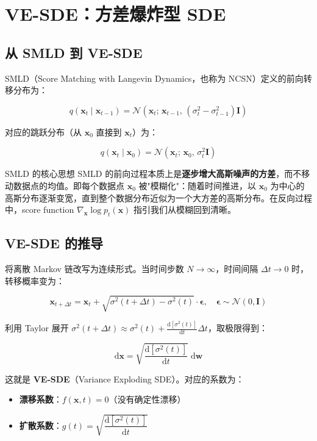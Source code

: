 \section{VE-SDE：方差爆炸型 SDE}

\subsection{从 SMLD 到 VE-SDE}

SMLD（Score Matching with Langevin Dynamics，也称为 NCSN）定义的前向转移分布为：

$$
q(\mathbf{x}_t \mid \mathbf{x}_{t-1}) = \mathcal{N}\!\left(\mathbf{x}_t;\, \mathbf{x}_{t-1},\, (\sigma_t^2 - \sigma_{t-1}^2)\mathbf{I}\right)
$$

对应的跳跃分布（从 $\mathbf{x}_0$ 直接到 $\mathbf{x}_t$）为：

$$
q(\mathbf{x}_t \mid \mathbf{x}_0) = \mathcal{N}\!\left(\mathbf{x}_t;\, \mathbf{x}_0,\, \sigma_t^2 \mathbf{I}\right)
$$

\begin{importantbox}{SMLD 的核心思想}
SMLD 的前向过程本质上是\textbf{逐步增大高斯噪声的方差}，而不移动数据点的均值。即每个数据点 $\mathbf{x}_0$ 被"模糊化"：随着时间推进，以 $\mathbf{x}_0$ 为中心的高斯分布逐渐变宽，直到整个数据分布近似为一个大方差的高斯分布。在反向过程中，score function $\nabla_{\mathbf{x}} \log p_t(\mathbf{x})$ 指引我们从模糊回到清晰。
\end{importantbox}

\subsection{VE-SDE 的推导}

将离散 Markov 链改写为连续形式。当时间步数 $N \to \infty$，时间间隔 $\Delta t \to 0$ 时，转移概率变为：

$$
\mathbf{x}_{t+\Delta t} = \mathbf{x}_t + \sqrt{\sigma^2(t+\Delta t) - \sigma^2(t)} \cdot \boldsymbol{\epsilon}, \quad \boldsymbol{\epsilon} \sim \mathcal{N}(0, \mathbf{I})
$$

利用 Taylor 展开 $\sigma^2(t+\Delta t) \approx \sigma^2(t) + \frac{\mathrm{d}[\sigma^2(t)]}{\mathrm{d}t}\Delta t$，取极限得到：

$$
\mathrm{d}\mathbf{x} = \sqrt{\frac{\mathrm{d}[\sigma^2(t)]}{\mathrm{d}t}}\;\mathrm{d}\mathbf{w}
$$

这就是 \textbf{VE-SDE}（Variance Exploding SDE）。对应的系数为：

\begin{itemize}
    \item \textbf{漂移系数}：$f(\mathbf{x}, t) = 0$（没有确定性漂移）
    \item \textbf{扩散系数}：$g(t) = \sqrt{\dfrac{\mathrm{d}[\sigma^2(t)]}{\mathrm{d}t}}$
\end{itemize}

